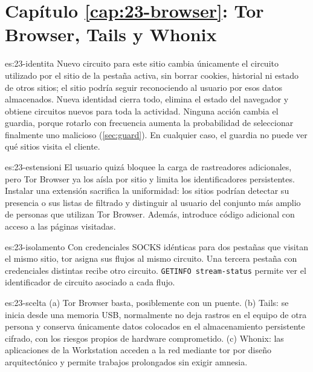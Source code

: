 \section*{Capítulo \ref{cap:23-browser}: Tor Browser, Tails y Whonix}

\begin{soluzione}{es:23-identita}
Nuevo circuito para este sitio cambia únicamente el circuito utilizado por el sitio de la pestaña activa, sin borrar cookies, historial ni estado de otros sitios; el sitio podría seguir reconociendo al usuario por esos datos almacenados. Nueva identidad cierra todo, elimina el estado del navegador y obtiene circuitos nuevos para toda la actividad. Ninguna acción cambia el guardia, porque rotarlo con frecuencia aumenta la probabilidad de seleccionar finalmente uno malicioso (\cref{sec:guard}). En cualquier caso, el guardia no puede ver qué sitios visita el cliente.
\end{soluzione}

\begin{soluzione}{es:23-estensioni}
El usuario quizá bloquee la carga de rastreadores adicionales, pero Tor Browser ya los aísla por sitio y limita los identificadores persistentes. Instalar una extensión sacrifica la uniformidad: los sitios podrían detectar su presencia o sus listas de filtrado y distinguir al usuario del conjunto más amplio de personas que utilizan Tor Browser. Además, introduce código adicional con acceso a las páginas visitadas.
\end{soluzione}

\begin{soluzione}{es:23-isolamento}
Con credenciales SOCKS idénticas para dos pestañas que visitan el mismo sitio, tor asigna sus flujos al mismo circuito. Una tercera pestaña con credenciales distintas recibe otro circuito. \texttt{GETINFO stream-status} permite ver el identificador de circuito asociado a cada flujo.
\end{soluzione}

\begin{soluzione}{es:23-scelta}
(a) Tor Browser basta, posiblemente con un puente. (b) Tails: se inicia desde una memoria USB, normalmente no deja rastros en el equipo de otra persona y conserva únicamente datos colocados en el almacenamiento persistente cifrado, con los riesgos propios de hardware comprometido. (c) Whonix: las aplicaciones de la Workstation acceden a la red mediante tor por diseño arquitectónico y permite trabajos prolongados sin exigir amnesia.
\end{soluzione}

